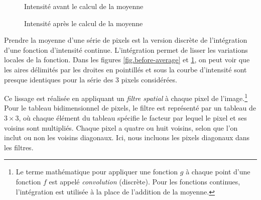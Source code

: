\begin{figure}
\begin{minipage}{.47\textwidth}
\caption{Intensité avant le calcul de la moyenne}\label{fig.before-average}
\end{minipage}
\hspace{\fill}
\begin{minipage}{.47\textwidth}
\caption{Intensité après le calcul de la moyenne}\label{fig.after-average}
\end{minipage}
\end{figure}

Prendre la moyenne d'une série de pixels est la version discrète de l'intégration d'une fonction d'intensité continue. L'intégration permet de lisser les variations locales de la fonction. Dans les figures \ref{fig.before-average} et \ref{fig.after-average}, on peut voir que les aires délimités par les droites en pointillés et sous la courbe d’intensité sont presque identiques pour la série des 3 pixels considérées.

Ce lissage est réalisée en appliquant un \emph{filtre spatial} à chaque pixel de l'image.\footnote{Le terme mathématique pour appliquer une fonction $g$ à chaque point d'une fonction $f$ est appelé \emph{convolution} (discrète). Pour les fonctions continues, l'intégration est utilisée à la place de l'addition de la moyenne.} Pour le tableau bidimensionnel de pixels, le filtre est représenté par un tableau de $3\times 3$, où chaque élément du tableau spécifie le facteur par lequel le pixel et ses voisins sont multipliés. Chaque pixel a quatre ou huit voisins, selon que l'on inclut ou non les voisins diagonaux. Ici, nous incluons les pixels diagonaux dans les filtres.

